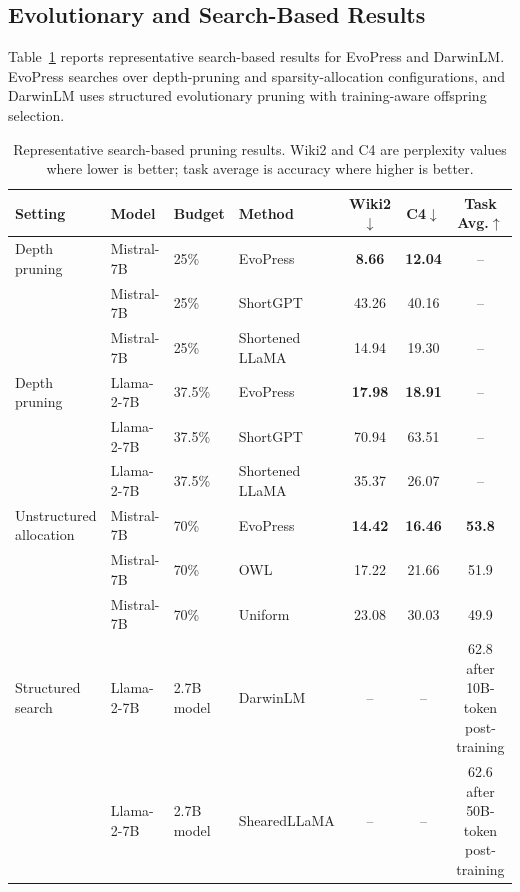 \subsection{Evolutionary and Search-Based Results}

Table~\ref{tab:search_summary} reports representative search-based results for EvoPress and DarwinLM. EvoPress searches over depth-pruning and sparsity-allocation configurations, and DarwinLM uses structured evolutionary pruning with training-aware offspring selection.

\begin{table}[H]
	\centering
	\caption[Representative search-based pruning results]{Representative search-based pruning results. Wiki2 and C4 are perplexity values where lower is better; task average is accuracy where higher is better.}
	\label{tab:search_summary}
	\begin{tabular}{@{}llllccc@{}}
		\toprule
		\textbf{Setting} & \textbf{Model} & \textbf{Budget} & \textbf{Method} & \textbf{Wiki2$\downarrow$} & \textbf{C4$\downarrow$} & \textbf{Task Avg.$\uparrow$} \\
		\midrule
		Depth pruning
		  & Mistral-7B & 25\% & EvoPress & \textbf{8.66} & \textbf{12.04} & -- \\
		  & Mistral-7B & 25\% & ShortGPT & 43.26 & 40.16 & -- \\
		  & Mistral-7B & 25\% & Shortened LLaMA & 14.94 & 19.30 & -- \\
		\midrule
		Depth pruning
		  & Llama-2-7B & 37.5\% & EvoPress & \textbf{17.98} & \textbf{18.91} & -- \\
		  & Llama-2-7B & 37.5\% & ShortGPT & 70.94 & 63.51 & -- \\
		  & Llama-2-7B & 37.5\% & Shortened LLaMA & 35.37 & 26.07 & -- \\
		\midrule
		Unstructured allocation
		  & Mistral-7B & 70\% & EvoPress & \textbf{14.42} & \textbf{16.46} & \textbf{53.8} \\
		  & Mistral-7B & 70\% & OWL & 17.22 & 21.66 & 51.9 \\
		  & Mistral-7B & 70\% & Uniform & 23.08 & 30.03 & 49.9 \\
		\midrule
		Structured search
		  & Llama-2-7B & 2.7B model & DarwinLM & -- & -- & 62.8 after 10B-token post-training \\
		  & Llama-2-7B & 2.7B model & ShearedLLaMA & -- & -- & 62.6 after 50B-token post-training \\
		\bottomrule
	\end{tabular}
\end{table}

